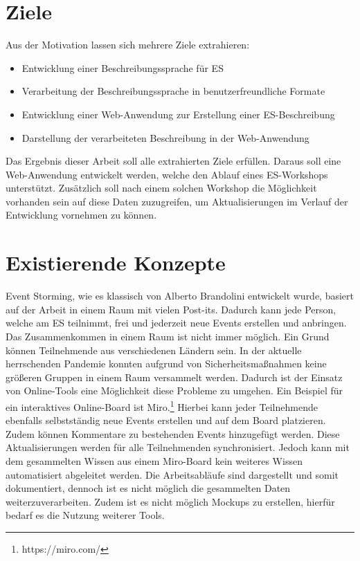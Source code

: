 \section{Ziele}\label{sec:ziele}
Aus der Motivation lassen sich mehrere Ziele extrahieren:

\begin{itemize}
    \item Entwicklung einer Beschreibungssprache für \ac{ES}
    \item Verarbeitung der Beschreibungssprache in benutzerfreundliche Formate
    \item Entwicklung einer Web-Anwendung zur Erstellung einer \ac{ES}-Beschreibung
    \item Darstellung der verarbeiteten Beschreibung in der Web-Anwendung
\end{itemize}

Das Ergebnis dieser Arbeit soll alle extrahierten Ziele erfüllen.
Daraus soll eine Web-Anwendung entwickelt werden, welche den Ablauf eines \ac{ES}-Workshops unterstützt.
Zusätzlich soll nach einem solchen Workshop die Möglichkeit vorhanden sein auf diese Daten zuzugreifen, um Aktualisierungen
im Verlauf der Entwicklung vornehmen zu können.


\section{Existierende Konzepte}\label{sec:existierende-konzepte}
Event Storming, wie es klassisch von Alberto Brandolini entwickelt wurde, basiert auf der Arbeit in einem Raum mit vielen Post-its\textsuperscript{\textregistered}.
Dadurch kann jede Person, welche am \ac{ES} teilnimmt, frei und jederzeit neue Events erstellen und anbringen.
Das Zusammenkommen in einem Raum ist nicht immer möglich.
Ein Grund können Teilnehmende aus verschiedenen Ländern sein.
In der aktuelle herrschenden Pandemie konnten aufgrund von Sicherheitsmaßnahmen keine größeren Gruppen in einem Raum versammelt werden.
Dadurch ist der Einsatz von Online-Tools eine Möglichkeit diese Probleme zu umgehen.
Ein Beispiel für ein interaktives Online-Board ist Miro.\footnote{https://miro.com/}
Hierbei kann jeder Teilnehmende ebenfalls selbstständig neue Events erstellen und auf dem Board platzieren.
Zudem können Kommentare zu bestehenden Events hinzugefügt werden.
Diese Aktualisierungen werden für alle Teilnehmenden synchronisiert.
Jedoch kann mit dem gesammelten Wissen aus einem Miro-Board kein weiteres Wissen automatisiert abgeleitet werden.
Die Arbeitsabläufe sind dargestellt und somit dokumentiert, dennoch ist es nicht möglich die gesammelten Daten
weiterzuverarbeiten.
Zudem ist es nicht möglich Mockups zu erstellen, hierfür bedarf es die Nutzung weiterer Tools.


